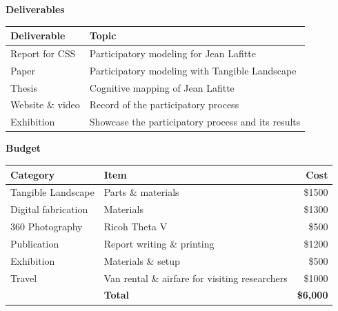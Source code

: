 \documentclass[11pt,article,oneside]{memoir}
\begin{document}
\noindent \textbf{Deliverables}
%
\begin{table}[H]
\small
\begin{tabu} to \textwidth {lX}
\toprule
Deliverable & Topic\\
\midrule
Report for CSS & Participatory modeling for Jean Lafitte\\
Paper & Participatory modeling with Tangible Landscape\\
Thesis & Cognitive mapping of Jean Lafitte\\
Website \& video & Record of the participatory process\\
Exhibition & Showcase the participatory process and its results\\
\bottomrule
\end{tabu}
\end{table}

\noindent \textbf{Budget}
%
\begin{table}[H]
\small
\begin{tabu} to \textwidth {lXr}
\toprule
Category & Item & Cost\\
\midrule
Tangible Landscape & Parts \& materials & \$1500 \\
Digital fabrication & Materials & \$1300 \\
360 Photography & Ricoh Theta V & \$500 \\
Publication & Report writing \& printing & \$1200 \\
Exhibition & Materials \& setup & \$500 \\
Travel & Van rental \& airfare for visiting researchers & \$1000 \\
& \textbf{Total} & \textbf{\$6,000}\\
\bottomrule
\end{tabu}
\end{table}
\end{document}

